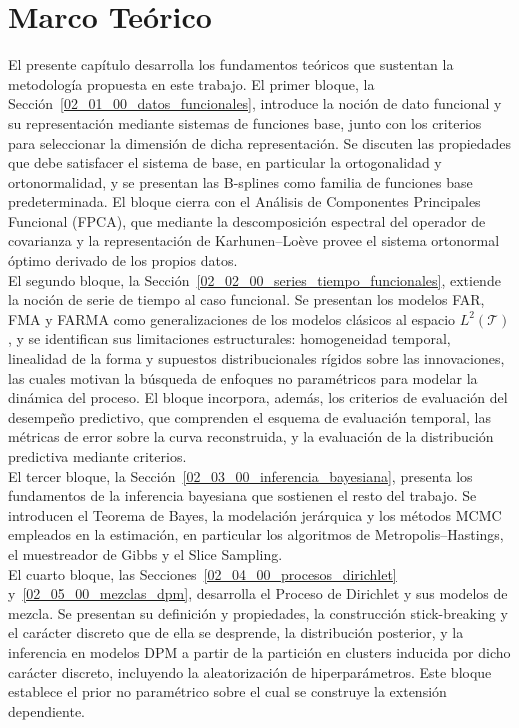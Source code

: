 \chapter{Marco Teórico}
\label{02_00_00_fundamentos_teoricos_metodologicos}
El presente capítulo desarrolla los fundamentos teóricos que sustentan la metodología propuesta en este trabajo. El primer bloque, la Sección~\ref{02_01_00_datos_funcionales}, introduce la noción de dato funcional y su representación mediante sistemas de funciones base, junto con los criterios para seleccionar la dimensión de dicha representación. Se discuten las propiedades que debe satisfacer el sistema de base, en particular la ortogonalidad y ortonormalidad, y se presentan las B-splines como familia de funciones base predeterminada. El bloque cierra con el Análisis de Componentes Principales Funcional (FPCA), que mediante la descomposición espectral del operador de covarianza y la representación de Karhunen--Loève provee el sistema ortonormal óptimo derivado de los propios datos.\\

El segundo bloque, la Sección~\ref{02_02_00_series_tiempo_funcionales}, extiende la noción de serie de tiempo al caso funcional. Se presentan los modelos FAR, FMA y FARMA como generalizaciones de los modelos clásicos al espacio $L^2(\mathcal{T})$, y se identifican sus limitaciones estructurales: homogeneidad temporal, linealidad de la forma y supuestos distribucionales rígidos sobre las innovaciones, las cuales motivan la búsqueda de enfoques no paramétricos para modelar la dinámica del proceso. El bloque incorpora, además, los criterios de evaluación del desempeño predictivo, que comprenden el esquema de evaluación temporal, las métricas de error sobre la curva reconstruida, y la evaluación de la distribución predictiva mediante criterios.\\

El tercer bloque, la Sección~\ref{02_03_00_inferencia_bayesiana}, presenta los fundamentos de la inferencia bayesiana que sostienen el resto del trabajo. Se introducen el Teorema de Bayes, la modelación jerárquica y los métodos MCMC empleados en la estimación, en particular los algoritmos de Metropolis--Hastings, el muestreador de Gibbs y el Slice Sampling.\\

El cuarto bloque, las Secciones~\ref{02_04_00_procesos_dirichlet} y~\ref{02_05_00_mezclas_dpm}, desarrolla el Proceso de Dirichlet y sus modelos de mezcla. Se presentan su definición y propiedades, la construcción stick-breaking y el carácter discreto que de ella se desprende, la distribución posterior, y la inferencia en modelos DPM a partir de la partición en clusters inducida por dicho carácter discreto, incluyendo la aleatorización de hiperparámetros. Este bloque establece el prior no paramétrico sobre el cual se construye la extensión dependiente.\\

